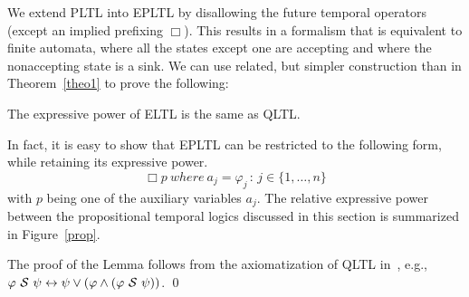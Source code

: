 \fi

We extend PLTL into EPLTL by disallowing the future temporal operators (except an implied prefixing $\Box$). This results in
a formalism that is equivalent to finite automata, where all the states except one are accepting and where the nonaccepting state is a sink. 
We can use related, but simpler construction than in Theorem~\ref{theo1} to prove the following:

\begin{lemma}
\label{simplecase}
The expressive power of 
ELTL is the same as QLTL.
\end{lemma}
In fact, it is easy to show that EPLTL can be restricted to the following form, while retaining its expressive power.
\[  \Box p {\ where\ } a_j  = \varphi_j \, : \, 
{j \in \{1, \ldots , n\}}  \] 
with $p$ being one of the auxiliary variables $a_j$. The relative expressive power between the propositional temporal logics discussed in this section is summarized in Figure~\ref{prop}.

\iffalse
{} The proof of the Lemma follows from the
axiomatization of QLTL in~\cite{MP}, e.g.,
$\varphi\ {\cal S}\ \psi \leftrightarrow \psi \vee ( \varphi \wedge (\varphi\ {\cal S}\ \psi))$. \qed



